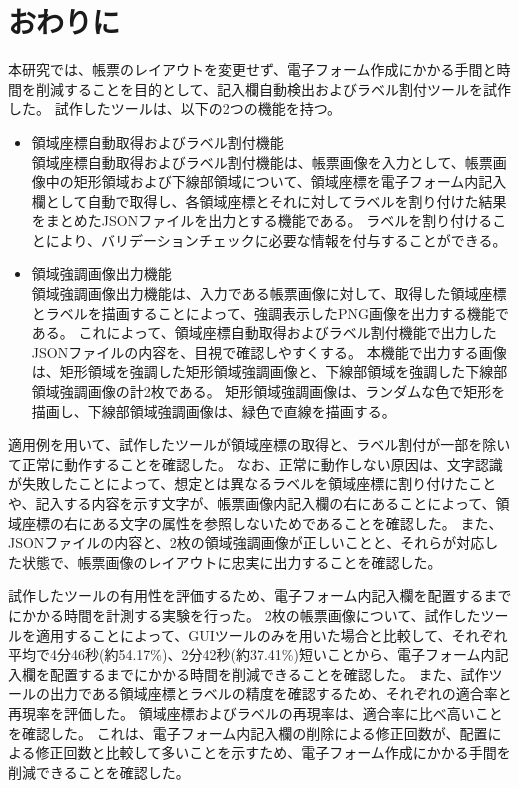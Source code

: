 \chapter{おわりに}\label{cha:Conclusion}
本研究では、帳票のレイアウトを変更せず、電子フォーム作成にかかる手間と時間を削減することを目的として、記入欄自動検出およびラベル割付ツールを試作した。
試作したツールは、以下の2つの機能を持つ。

\begin{itemize}
  \item 領域座標自動取得およびラベル割付機能\\
      領域座標自動取得およびラベル割付機能は、帳票画像を入力として、帳票画像中の矩形領域および下線部領域について、領域座標を電子フォーム内記入欄として自動で取得し、各領域座標とそれに対してラベルを割り付けた結果をまとめたJSONファイルを出力とする機能である。
      ラベルを割り付けることにより、バリデーションチェックに必要な情報を付与することができる。
  \item 領域強調画像出力機能\\
      領域強調画像出力機能は、入力である帳票画像に対して、取得した領域座標とラベルを描画することによって、強調表示したPNG画像を出力する機能である。
      これによって、領域座標自動取得およびラベル割付機能で出力したJSONファイルの内容を、目視で確認しやすくする。
      本機能で出力する画像は、矩形領域を強調した矩形領域強調画像と、下線部領域を強調した下線部領域強調画像の計2枚である。
      矩形領域強調画像は、ランダムな色で矩形を描画し、下線部領域強調画像は、緑色で直線を描画する。
\end{itemize}

適用例を用いて、試作したツールが領域座標の取得と、ラベル割付が一部を除いて正常に動作することを確認した。
なお、正常に動作しない原因は、文字認識が失敗したことによって、想定とは異なるラベルを領域座標に割り付けたことや、記入する内容を示す文字が、帳票画像内記入欄の右にあることによって、領域座標の右にある文字の属性を参照しないためであることを確認した。
また、JSONファイルの内容と、2枚の領域強調画像が正しいことと、それらが対応した状態で、帳票画像のレイアウトに忠実に出力することを確認した。

試作したツールの有用性を評価するため、電子フォーム内記入欄を配置するまでにかかる時間を計測する実験を行った。
2枚の帳票画像について、試作したツールを適用することによって、GUIツールのみを用いた場合と比較して、それぞれ平均で4分46秒(約54.17\%)、2分42秒(約37.41\%)短いことから、電子フォーム内記入欄を配置するまでにかかる時間を削減できることを確認した。
また、試作ツールの出力である領域座標とラベルの精度を確認するため、それぞれの適合率と再現率を評価した。
領域座標およびラベルの再現率は、適合率に比べ高いことを確認した。
これは、電子フォーム内記入欄の削除による修正回数が、配置による修正回数と比較して多いことを示すため、電子フォーム作成にかかる手間を削減できることを確認した。

